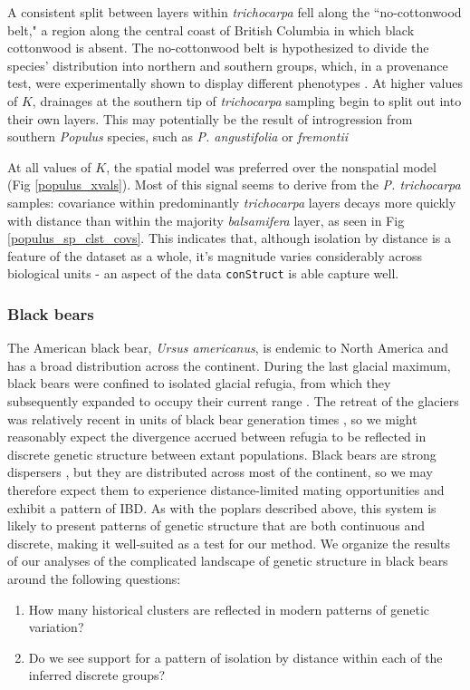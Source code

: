\documentclass[12pt]{article}
\newcommand{\tri}{\textit{trichocarpa}}
\newcommand{\bals}{\textit{balsamifera}}
\begin{document}
A consistent split between layers within \tri{} fell along the ``no-cottonwood belt," 
a region along the central coast of British Columbia in which black cottonwood is absent. 
The no-cottonwood belt is hypothesized to divide the species' distribution 
into northern and southern groups, which, in a provenance test, 
were experimentally shown to display different phenotypes 
\citep[e.g., pathogen resistance,][]{xie2009,xie2012}.  
At higher values of $K$, drainages at the southern tip of \tri{} sampling 
begin to split out into their own layers.  
This may potentially be the result of introgression from southern \textit{Populus} species, 
such as \textit{P. angustifolia} or \textit{fremontii} \citep{Zhou2012,geraldes_etal_2014}

At all values of $K$, the spatial model was preferred over the nonspatial model (Fig \ref{populus_xvals}).
Most of this signal seems to derive from the \textit{P. trichocarpa} samples:
covariance within predominantly \tri{} layers decays more quickly with distance
than within the majority \bals{} layer, as seen in Fig \ref{populus_sp_clst_covs}.  
This indicates that, although isolation by distance is a feature of the dataset as a whole, 
it's magnitude varies considerably across biological units - 
an aspect of the data \texttt{conStruct} is able capture well.


\subsubsection*{Black bears}
The American black bear, \textit{Ursus americanus}, is endemic to North America
and has a broad distribution across the continent.
During the last glacial maximum, 
black bears were confined to isolated glacial refugia, 
from which they subsequently expanded to occupy their current range
\citep{WoodingWard1997,Byun1997,Stone2000,Puckett2015}.
The retreat of the glaciers was relatively recent in units of 
black bear generation times \citep{Onorato2004}, 
so we might reasonably expect the divergence accrued between refugia 
to be reflected in discrete genetic structure between extant populations.
Black bears are strong dispersers \citep{Moore2014}, 
but they are distributed across most of the continent, 
so we may therefore expect them to experience distance-limited 
mating opportunities and exhibit a pattern of IBD.
As with the poplars described above, 
this system is likely to present patterns of genetic structure 
that are both continuous and discrete, 
making it well-suited as a test for our method.
We organize the results of our analyses of 
the complicated landscape of genetic structure in black bears 
around the following questions:
\begin{enumerate}
\item How many historical clusters are reflected in modern patterns of genetic variation?
\item Do we see support for a pattern of isolation by distance within each of the inferred discrete groups?
\end{enumerate}
\end{document}

